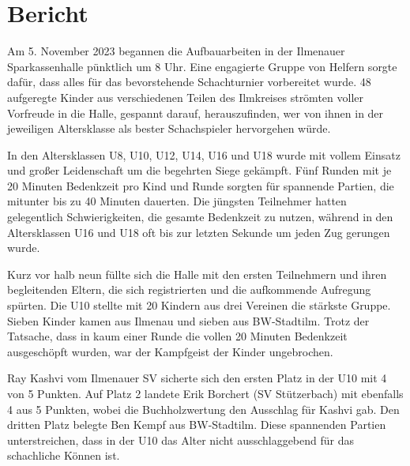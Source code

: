 \documentclass[a4paper,ngerman]{tui-algo-seminar}
\title{\content}
\author{Erik Skopp}
\begin{document}
	
	\maketitle
\thispagestyle{plain} %

\begin{abstract}
Das Schachturnier "Kreiseinzelmeisterschaft der Jugend im Ilm-Kreis 2023" zog 48 Teilnehmer aus verschiedenen Teilen des Ilmkreises an. In den Altersklassen U8 bis U18 kämpften die Kinder in fünf Runden mit je 20 Minuten Bedenkzeit. Überraschende Ergebnisse und fairer Wettbewerb prägten das Turnier, bei dem die Sieger sich für die Bezirkseinzelmeisterschaft im Januar 2024 qualifizierten. Die Veranstaltung verlief reibungslos und zeichnete sich durch eine freundliche Atmosphäre aus. 
\end{abstract}

\section{Bericht}
Am 5. November 2023 begannen die Aufbauarbeiten in der Ilmenauer Sparkassenhalle pünktlich um 8 Uhr. Eine engagierte Gruppe von Helfern sorgte dafür, dass alles für das bevorstehende Schachturnier vorbereitet wurde. 48 aufgeregte Kinder aus verschiedenen Teilen des Ilmkreises strömten voller Vorfreude in die Halle, gespannt darauf, herauszufinden, wer von ihnen in der jeweiligen Altersklasse als bester Schachspieler hervorgehen würde.

In den Altersklassen U8, U10, U12, U14, U16 und U18 wurde mit vollem Einsatz und großer Leidenschaft um die begehrten Siege gekämpft. Fünf Runden mit je 20 Minuten Bedenkzeit pro Kind und Runde sorgten für spannende Partien, die mitunter bis zu 40 Minuten dauerten. Die jüngsten Teilnehmer hatten gelegentlich Schwierigkeiten, die gesamte Bedenkzeit zu nutzen, während in den Altersklassen U16 und U18 oft bis zur letzten Sekunde um jeden Zug gerungen wurde.

Kurz vor halb neun füllte sich die Halle mit den ersten Teilnehmern und ihren begleitenden Eltern, die sich registrierten und die aufkommende Aufregung spürten. Die U10 stellte mit 20 Kindern aus drei Vereinen die stärkste Gruppe. Sieben Kinder kamen aus Ilmenau und sieben aus BW-Stadtilm. Trotz der Tatsache, dass in kaum einer Runde die vollen 20 Minuten Bedenkzeit ausgeschöpft wurden, war der Kampfgeist der Kinder ungebrochen.

Ray Kashvi vom Ilmenauer SV sicherte sich den ersten Platz in der U10 mit 4 von 5 Punkten. Auf Platz 2 landete Erik Borchert (SV Stützerbach) mit ebenfalls 4 aus 5 Punkten, wobei die Buchholzwertung den Ausschlag für Kashvi gab. Den dritten Platz belegte Ben Kempf aus BW-Stadtilm. Diese spannenden Partien unterstreichen, dass in der U10 das Alter nicht ausschlaggebend für das schachliche Können ist.
\end{document}
